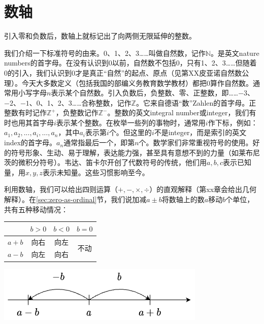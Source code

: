 \documentclass[b5paper]{ctexart}
\begin{document}
\section{数轴}
引入零和负数后，数轴上就标记出了向两侧无限延伸的整数。

\begin{center}
\end{center}

我们介绍一下标准符号的由来。0、1、2、3……叫做自然数，记作$\mathbb{N}$。是英文nature numbers的首字母。在没有认识到0以前，自然数不包括0，只有1、2、3……但随着0的引入，我们认识到0才是真正“自然”的起点、原点（见第XX皮亚诺自然数公理）。今天大多数定义（包括我国的部编义务教育数学教材）都把0算作自然数。通常用小写字母$n$表示某个自然数。引入负数后，负整数、零、正整数，即……$-3$、$-2$、$-1$、0、1、2、3……合称整数，记作$\mathbb{Z}$。它来自德语“数”Zahlen的首字母。正整数有时记作$\mathbb{Z}^+$，负整数记作$\mathbb{Z}^-$。整数的英文integral number或integer，我们有时也用其首字母$i$表示某个整数。在枚举一些列的事物时，通常用$i$作下标，例如：$a_1, a_2, ..., a_i, ..., a_n$，其中$a_i$表示第$i$个。但这里的$i$不是integer，而是索引的英文index的首字母。$a_n$通常指最后一个，即第$n$个。数学家们非常重视符号的使用。好的符号形象、生动、易于理解，表达能力强，甚至具有意想不到的力量（如莱布尼茨的微积分符号）。韦达、笛卡尔开创了代数符号的传统，他们用$a, b, c$表示已知量，用$x, y, z$表示未知量。这些习惯影响至今。

利用数轴，我们可以给出四则运算（$+, -, \times, \div$）的直观解释（第xx章会给出几何解释）。在\ref{sec:zero-as-ordinal}节，我们说加减$a \pm b$将数轴上的数$a$移动$b$个单位，共有五种移动情况：

\begin{multicols}{2}
  \begin{tabular}{c|c|c|c}
          & $b > 0$ & $b < 0$ & $b = 0$ \\
  \hline
  $a + b$ & 向右     & 向左    & \multirow{2}{*}{不动} \\
  \cline{1-3}
  $a - b$ & 向左     & 向右
  \end{tabular}

 \includegraphics[scale=0.4]{img/translate}
\end{multicols}
\end{document}
